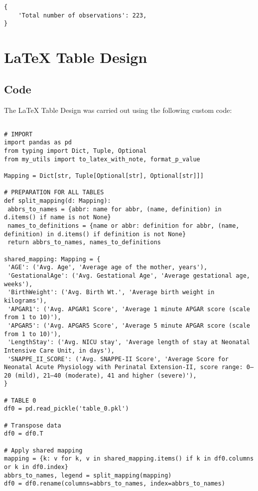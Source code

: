 \documentclass[11pt]{article}
\begin{document}
\begin{Verbatim}[tabsize=4]
{
    'Total number of observations': 223,
}
\end{Verbatim}

\section{LaTeX Table Design} \subsection{Code}The LaTeX Table Design was carried out using the following custom code:

\begin{verbatim}

# IMPORT
import pandas as pd
from typing import Dict, Tuple, Optional
from my_utils import to_latex_with_note, format_p_value

Mapping = Dict[str, Tuple[Optional[str], Optional[str]]]

# PREPARATION FOR ALL TABLES
def split_mapping(d: Mapping):
 abbrs_to_names = {abbr: name for abbr, (name, definition) in d.items() if name is not None}
 names_to_definitions = {name or abbr: definition for abbr, (name, definition) in d.items() if definition is not None}
 return abbrs_to_names, names_to_definitions

shared_mapping: Mapping = {
 'AGE': ('Avg. Age', 'Average age of the mother, years'),
 'GestationalAge': ('Avg. Gestational Age', 'Average gestational age, weeks'),
 'BirthWeight': ('Avg. Birth Wt.', 'Average birth weight in kilograms'),
 'APGAR1': ('Avg. APGAR1 Score', 'Average 1 minute APGAR score (scale from 1 to 10)'),
 'APGAR5': ('Avg. APGAR5 Score', 'Average 5 minute APGAR score (scale from 1 to 10)'),
 'LengthStay': ('Avg. NICU stay', 'Average length of stay at Neonatal Intensive Care Unit, in days'),
 'SNAPPE_II_SCORE': ('Avg. SNAPPE-II Score', 'Average Score for Neonatal Acute Physiology with Perinatal Extension-II, score range: 0–20 (mild), 21–40 (moderate), 41 and higher (severe)'),
}

# TABLE 0
df0 = pd.read_pickle('table_0.pkl')

# Transpose data
df0 = df0.T

# Apply shared mapping
mapping = {k: v for k, v in shared_mapping.items() if k in df0.columns or k in df0.index}
abbrs_to_names, legend = split_mapping(mapping)
df0 = df0.rename(columns=abbrs_to_names, index=abbrs_to_names)


\end{verbatim}
\end{document}

